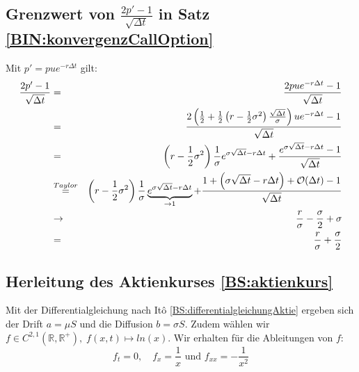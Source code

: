 \subsection{Grenzwert von $\frac{2p' - 1}{\sqrt{\Delta t}}$ in Satz \ref{BIN:konvergenzCallOption}}
\label{Anhang:Taylorp'} 
Mit $p' = pue^{-r\Delta t}$ gilt:
\begin{eqnarray*}
\frac{2p'-1}{\sqrt{\Delta t}} & = & \frac{2pue^{-r\Delta t}-1}{\sqrt{\Delta t}} \\
 & = & \frac{2\left(\frac{1}{2} + \frac{1}{2}\left(r-\frac{1}{2}\sigma^2\right)\frac{\sqrt{\Delta t}}{\sigma}\right)ue^{-r\Delta t}-1}{\sqrt{\Delta t}} \\
 & = & \left(r-\frac{1}{2}\sigma^2\right)\frac{1}{\sigma}e^{\sigma\sqrt{\Delta t}-r\Delta t} + \frac{e^{\sigma\sqrt{\Delta t}-r\Delta t} - 1}{\sqrt{\Delta t}} \\
 & \overset{\tiny Taylor}{=} & \left(r-\frac{1}{2}\sigma^2\right)\frac{1}{\sigma}\underbrace{e^{\sigma\sqrt{\Delta t}-r\Delta t}}_{\to 1} + \frac{1+\left(\sigma\sqrt{\Delta t} - r\Delta t\right) + \mathcal{O}(\Delta t) - 1}{\sqrt{\Delta t}} \\
 & \to & \frac{r}{\sigma} - \frac{\sigma}{2} + \sigma \\
 & = & \frac{r}{\sigma} + \frac{\sigma}{2} 
\end{eqnarray*}


\subsection{Herleitung des Aktienkurses \ref{BS:aktienkurs}} \label{Anhang:HerleitungBSAktienkurs}
Mit der Differentialgleichung nach Itô \ref{BS:differentialgleichungAktie} ergeben sich der Drift $a = \mu S$ und die Diffusion $b = \sigma S$. Zudem wählen wir $f \in C^{2,1}(\mathbb{R}, \mathbb{R}^+), \; f(x,t) \mapsto ln(x)$. Wir erhalten für die Ableitungen von $f$:
\begin{equation*}
f_t = 0, \quad f_x = \frac{1}{x} \text{ und } f_{xx} = -\frac{1}{x^2} 
\end{equation*}

